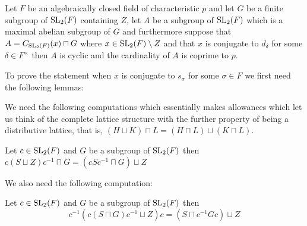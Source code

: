 \begin{theorem}
  \label{MaximalAbelianSubgroup.IsCyclic_and_card_coprime_CharP_of_IsConj_d}
  \leanok
  Let $F$ be an algebraically closed field of characteristic $p$ and let $G$ be a finite subgroup of $\operatorname{SL}_2(F)$ containing $Z$, let $A$ be a subgroup of $\operatorname{SL}_2(F)$ which is a maximal abelian subgroup of $G$ and furthermore suppose 
  that $A = C_{\operatorname{SL}_2(F)}(x) \sqcap G$ where $x \in \operatorname{SL}_2(F) \setminus Z$ and that $x$ is conjugate to $d_\delta$ for some $\delta \in F^\times$ then $A$ is cyclic and the cardinality of $A$ is coprime to $p$.
\end{theorem}

To prove the statement when $x$ is conjugate to $s_\sigma$ for some $\sigma \in F$ we first need the following lemmas:

\begin{lemma}
  \label{MaximalAbelianSubgroup.centralizer_eq_conj_SZ_of_IsConj_s_or_IsConj_neg_s}
  \leanok
\end{lemma}

We need the following computations which essentially makes allowances which let us think of the complete lattice structure with the further property of
being a distributive lattice, that is, $(H \sqcup K) \sqcap L = (H \sqcap L) \sqcup (K \sqcap L)$.


\begin{lemma}
  \label{MaximalAbelianSubgroup.conj_T_join_Z_meet_G_eq_conj_T_meet_G_join_Z}
  \leanok

  Let $c \in \operatorname{SL}_2(F)$  and $G$ be a subgroup of $\operatorname{SL}_2(F)$ then $c(S \sqcup Z)c^{-1} \sqcap G = (cSc^{-1} \sqcap G) \sqcup Z$
\end{lemma}

We also need the following computation:
\begin{lemma}
\label{MaximalAbelianSubgroup.conj_inv_conj_eq}
\leanok
Let $c \in \operatorname{SL}_2(F)$ and $G$ be a subgroup of $\operatorname{SL}_2(F)$ then 
\[
c^{-1}(c(S \sqcap G)c^{-1} \sqcup Z)c = (S \sqcap c^{-1}Gc) \sqcup Z
\]
\end{lemma}

